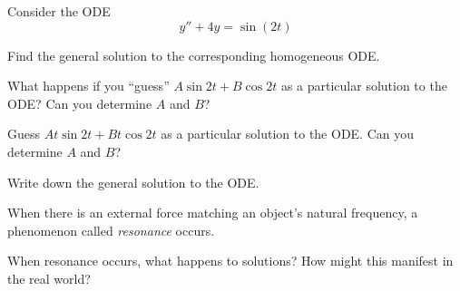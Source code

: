 \documentclass{workbook}
\begin{document}
\begin{slide}
	\question

	Consider the ODE
	\[
	y''+4y=\sin(2t)
	\]

	\begin{parts}
		\item Find the general solution to the corresponding homogeneous ODE.
		\item What happens if you ``guess'' $A\sin 2t + B\cos 2t$ as a particular solution to the ODE? Can you determine $A$ and $B$?
		\item Guess $At \sin 2t + Bt\cos 2t$ as a particular solution
		to the ODE. Can you determine $A$ and $B$?
		\item Write down the general solution to the ODE.
		\item When there is an external force matching an object's natural frequency, a phenomenon called \emph{resonance} occurs.

		When resonance occurs, what happens to solutions? How might this manifest in the real world?
	\end{parts}

\end{slide}
\end{document}
